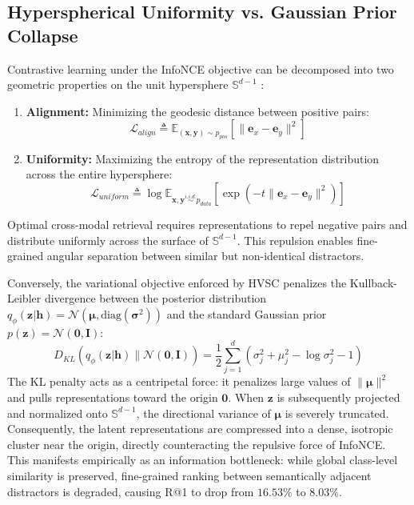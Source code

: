 \documentclass[journal]{IEEEtran}
\begin{document}
\subsection{Hyperspherical Uniformity vs. Gaussian Prior Collapse}
Contrastive learning under the InfoNCE objective can be decomposed into two geometric properties on the unit hypersphere $\mathbb{S}^{d-1}$ \cite{wang2020understanding}:
\begin{enumerate}
    \item \textbf{Alignment:} Minimizing the geodesic distance between positive pairs:
    \begin{equation}
    \mathcal{L}_{align} \triangleq \mathbb{E}_{(\mathbf{x}, \mathbf{y}) \sim p_{pos}} \left[ \|\mathbf{e}_x - \mathbf{e}_y\|^2 \right]
    \end{equation}
    \item \textbf{Uniformity:} Maximizing the entropy of the representation distribution across the entire hypersphere:
    \begin{equation}
    \mathcal{L}_{uniform} \triangleq \log \mathbb{E}_{\mathbf{x}, \mathbf{y} \stackrel{i.i.d.}{\sim} p_{data}} \left[ \exp(-t \|\mathbf{e}_x - \mathbf{e}_y\|^2) \right]
    \end{equation}
\end{enumerate}
Optimal cross-modal retrieval requires representations to repel negative pairs and distribute uniformly across the surface of $\mathbb{S}^{d-1}$. This repulsion enables fine-grained angular separation between similar but non-identical distractors.

Conversely, the variational objective enforced by HVSC penalizes the Kullback-Leibler divergence between the posterior distribution $q_\phi(\mathbf{z}|\mathbf{h}) = \mathcal{N}(\boldsymbol{\mu}, \text{diag}(\boldsymbol{\sigma}^2))$ and the standard Gaussian prior $p(\mathbf{z}) = \mathcal{N}(\mathbf{0}, \mathbf{I})$:
\begin{equation}
D_{KL}(q_\phi(\mathbf{z}|\mathbf{h}) \parallel \mathcal{N}(\mathbf{0}, \mathbf{I})) = \frac{1}{2} \sum_{j=1}^d \left( \sigma_j^2 + \mu_j^2 - \log \sigma_j^2 - 1 \right)
\end{equation}
The KL penalty acts as a centripetal force: it penalizes large values of $\|\boldsymbol{\mu}\|^2$ and pulls representations toward the origin $\mathbf{0}$. When $\mathbf{z}$ is subsequently projected and normalized onto $\mathbb{S}^{d-1}$, the directional variance of $\boldsymbol{\mu}$ is severely truncated. Consequently, the latent representations are compressed into a dense, isotropic cluster near the origin, directly counteracting the repulsive force of InfoNCE. This manifests empirically as an information bottleneck: while global class-level similarity is preserved, fine-grained ranking between semantically adjacent distractors is degraded, causing R@1 to drop from $16.53\%$ to $8.03\%$.
\end{document}

